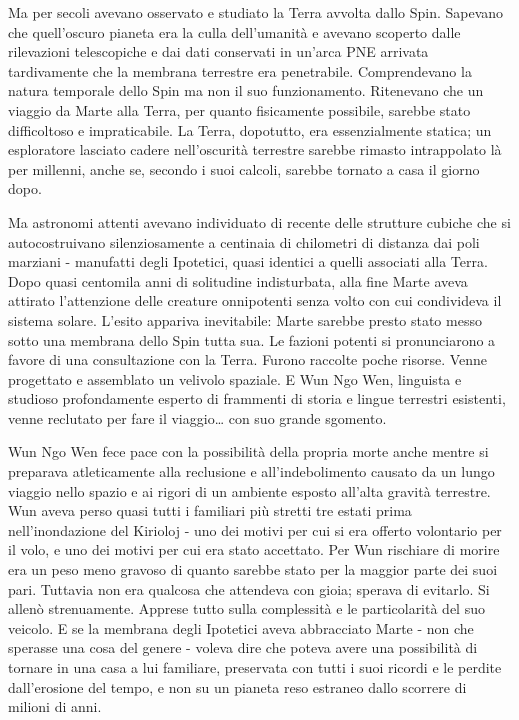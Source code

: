 Ma per secoli avevano osservato e studiato la Terra avvolta dallo Spin.
Sapevano che quell'oscuro pianeta era la culla dell'umanità e avevano
scoperto dalle rilevazioni telescopiche e dai dati conservati in un'arca
PNE arrivata tardivamente che la membrana terrestre era penetrabile.
Comprendevano la natura temporale dello Spin ma non il suo
funzionamento. Ritenevano che un viaggio da Marte alla Terra, per quanto
fisicamente possibile, sarebbe stato difficoltoso e impraticabile. La
Terra, dopotutto, era essenzialmente statica; un esploratore lasciato
cadere nell'oscurità terrestre sarebbe rimasto intrappolato là per
millenni, anche se, secondo i suoi calcoli, sarebbe tornato a casa il
giorno dopo.

Ma astronomi attenti avevano individuato di recente delle strutture
cubiche che si autocostruivano silenziosamente a centinaia di chilometri
di distanza dai poli marziani - manufatti degli Ipotetici, quasi
identici a quelli associati alla Terra. Dopo quasi centomila anni di
solitudine indisturbata, alla fine Marte aveva attirato l'attenzione
delle creature onnipotenti senza volto con cui condivideva il sistema
solare. L'esito appariva inevitabile: Marte sarebbe presto stato messo
sotto una membrana dello Spin tutta sua. Le fazioni potenti si
pronunciarono a favore di una consultazione con la Terra. Furono
raccolte poche risorse. Venne progettato e assemblato un velivolo
spaziale. E Wun Ngo Wen, linguista e studioso profondamente esperto di
frammenti di storia e lingue terrestri esistenti, venne reclutato per
fare il viaggio\ldots{} con suo grande sgomento.

Wun Ngo Wen fece pace con la possibilità della propria morte anche
mentre si preparava atleticamente alla reclusione e all'indebolimento
causato da un lungo viaggio nello spazio e ai rigori di un ambiente
esposto all'alta gravità terrestre. Wun aveva perso quasi tutti i
familiari più stretti tre estati prima nell'inondazione del Kirioloj -
uno dei motivi per cui si era offerto volontario per il volo, e uno dei
motivi per cui era stato accettato. Per Wun rischiare di morire era un
peso meno gravoso di quanto sarebbe stato per la maggior parte dei suoi
pari. Tuttavia non era qualcosa che attendeva con gioia; sperava di
evitarlo. Si allenò strenuamente. Apprese tutto sulla complessità e le
particolarità del suo veicolo. E se la membrana degli Ipotetici aveva
abbracciato Marte - non che sperasse una cosa del genere - voleva dire
che poteva avere una possibilità di tornare in una casa a lui familiare,
preservata con tutti i suoi ricordi e le perdite dall'erosione del
tempo, e non su un pianeta reso estraneo dallo scorrere di milioni di
anni.


